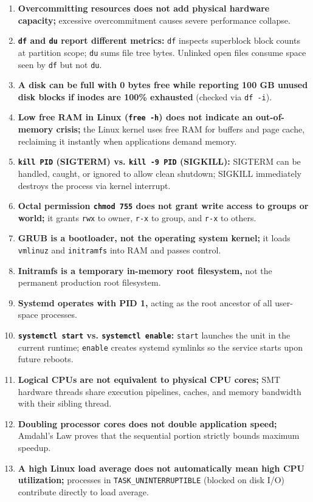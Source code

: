 \begin{enumerate}
    \item \textbf{Overcommitting resources does not add physical hardware capacity;} excessive overcommitment causes severe performance collapse.
    \item \textbf{\texttt{df} and \texttt{du} report different metrics:} \texttt{df} inspects superblock block counts at partition scope; \texttt{du} sums file tree bytes. Unlinked open files consume space seen by \texttt{df} but not \texttt{du}.
    \item \textbf{A disk can be full with 0 bytes free while reporting 100 GB unused disk blocks if inodes are 100\% exhausted} (checked via \texttt{df -i}).
    \item \textbf{Low free RAM in Linux (\texttt{free -h}) does not indicate an out-of-memory crisis;} the Linux kernel uses free RAM for buffers and page cache, reclaiming it instantly when applications demand memory.
    \item \textbf{\texttt{kill PID} (SIGTERM) vs. \texttt{kill -9 PID} (SIGKILL):} SIGTERM can be handled, caught, or ignored to allow clean shutdown; SIGKILL immediately destroys the process via kernel interrupt.
    \item \textbf{Octal permission \texttt{chmod 755} does not grant write access to groups or world;} it grants \texttt{rwx} to owner, \texttt{r-x} to group, and \texttt{r-x} to others.
    \item \textbf{GRUB is a bootloader, not the operating system kernel;} it loads \texttt{vmlinuz} and \texttt{initramfs} into RAM and passes control.
    \item \textbf{Initramfs is a temporary in-memory root filesystem,} not the permanent production root filesystem.
    \item \textbf{Systemd operates with PID 1,} acting as the root ancestor of all user-space processes.
    \item \textbf{\texttt{systemctl start} vs. \texttt{systemctl enable}:} \texttt{start} launches the unit in the current runtime; \texttt{enable} creates systemd symlinks so the service starts upon future reboots.
    \item \textbf{Logical CPUs are not equivalent to physical CPU cores;} SMT hardware threads share execution pipelines, caches, and memory bandwidth with their sibling thread.
    \item \textbf{Doubling processor cores does not double application speed;} Amdahl's Law proves that the sequential portion strictly bounds maximum speedup.
    \item \textbf{A high Linux load average does not automatically mean high CPU utilization;} processes in \texttt{TASK\_UNINTERRUPTIBLE} (blocked on disk I/O) contribute directly to load average.

\end{enumerate}

